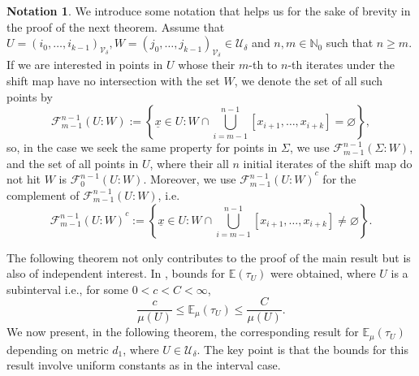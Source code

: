 \documentclass[11pt, reqno]{amsart}
\theoremstyle{plain}%
\theoremstyle{definition}
\newtheorem*{notation*}{Notation}
\theoremstyle{definition}
\def\N{\ensuremath{\mathbb N}}
\def\U{\ensuremath{\mathcal U}}
\def\F{\ensuremath{\mathcal F}}
\def\E{\mathbb E}
\def\st{such that }
\def\ulx{\underline{x}}
\numberwithin{equation}{section}
\begin{document}
\begin{notation*}
We introduce some notation that helps us for the sake of brevity in the proof of the next theorem. Assume that $U=(i_0,\ldots,i_{k-1})_{\mathcal{V}_\delta}, W=(j_0,\ldots,j_{k-1})_{\mathcal{V}_\delta}\in\U_\delta$ and $n, m\in\N_0$ \st $n\ge m$. If we are interested in points in $U$ whose their $m$-th to $n$-th iterates under the shift map have no intersection with the set $W$, we denote the set of all such points by
$$\F_{m-1}^{n-1}(U:W):=\left\{ \ulx\in U:W\cap  \bigcup_{i=m-1}^{n-1} [x_{i+1},\ldots,x_{i+k}]=\varnothing  \right\},$$ 
so, in the case we seek the same property for points in $\Sigma$, we use $\F_{m-1}^{n-1}(\Sigma:W)$, and the set of all points in $U$, where their all $n$ initial iterates of the shift map do not hit $W$ is $\F_0^{n-1}(U:W)$.
Moreover, we use ${\F_{m-1}^{n-1}(U:W)}^c$ for the complement of $\F_{m-1}^{n-1}(U:W)$, i.e. $${\F_{m-1}^{n-1}(U:W)}^c:=\left\{\ulx\in U:W\cap  \bigcup_{i=m-1}^{n-1} [x_{i+1},\ldots,x_{i+k}]\neq \varnothing  \right\}.$$
\end{notation*}


The following theorem not only contributes to the proof of the main result but is also of independent interest.
In \cite[Theorem 4.1]{MikeNatali}, bounds for $\E(\tau_U)$ were obtained, where $U$ is a subinterval i.e., for some $0<c<C<\infty$,
$$\frac{c}{\mu( U)} \le\E_\mu\left(\tau_{U}\right)\le \frac{C}{\mu( U)}.$$
We now present, in the following theorem, the corresponding result for $\E_\mu\left(\tau_{U}\right)$ depending on metric $d_1$, where $U\in\U_\delta$. The key point is that the bounds for this result involve uniform constants as in the interval case.
\end{document}
